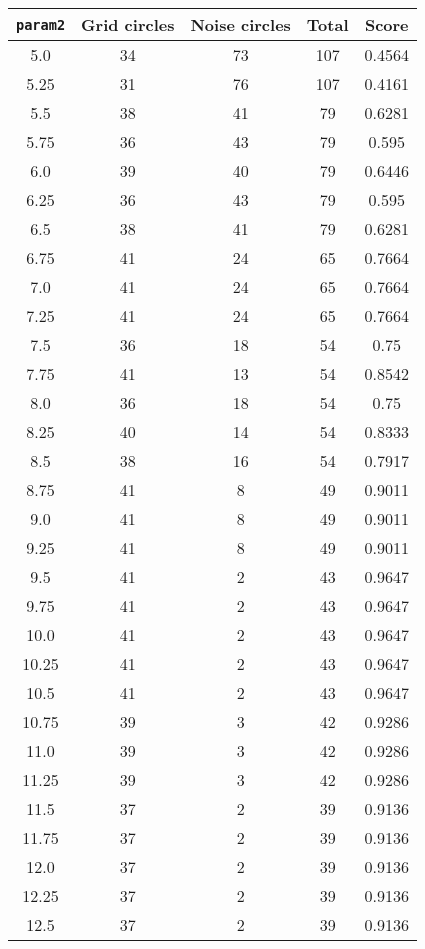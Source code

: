 \documentclass[letterpaper, 12pt]{article}
\begin{document}
\begin{longtable}{|c|c|c|c|c|}
\hline
\textbf{\texttt{param2}} & \textbf{Grid circles} & \textbf{Noise circles} & \textbf{Total} & \textbf{Score} \\
\hline
5.0 & 34 & 73 & 107 & 0.4564 \\
\hline
5.25 & 31 & 76 & 107 & 0.4161 \\
\hline
5.5 & 38 & 41 & 79 & 0.6281 \\
\hline
5.75 & 36 & 43 & 79 & 0.595 \\
\hline
6.0 & 39 & 40 & 79 & 0.6446 \\
\hline
6.25 & 36 & 43 & 79 & 0.595 \\
\hline
6.5 & 38 & 41 & 79 & 0.6281 \\
\hline
6.75 & 41 & 24 & 65 & 0.7664 \\
\hline
7.0 & 41 & 24 & 65 & 0.7664 \\
\hline
7.25 & 41 & 24 & 65 & 0.7664 \\
\hline
7.5 & 36 & 18 & 54 & 0.75 \\
\hline
7.75 & 41 & 13 & 54 & 0.8542 \\
\hline
8.0 & 36 & 18 & 54 & 0.75 \\
\hline
8.25 & 40 & 14 & 54 & 0.8333 \\
\hline
8.5 & 38 & 16 & 54 & 0.7917 \\
\hline
8.75 & 41 & 8 & 49 & 0.9011 \\
\hline
9.0 & 41 & 8 & 49 & 0.9011 \\
\hline
9.25 & 41 & 8 & 49 & 0.9011 \\
\hline
9.5 & 41 & 2 & 43 & 0.9647 \\
\hline
9.75 & 41 & 2 & 43 & 0.9647 \\
\hline
10.0 & 41 & 2 & 43 & 0.9647 \\
\hline
10.25 & 41 & 2 & 43 & 0.9647 \\
\hline
10.5 & 41 & 2 & 43 & 0.9647 \\
\hline
10.75 & 39 & 3 & 42 & 0.9286 \\
\hline
11.0 & 39 & 3 & 42 & 0.9286 \\
\hline
11.25 & 39 & 3 & 42 & 0.9286 \\
\hline
11.5 & 37 & 2 & 39 & 0.9136 \\
\hline
11.75 & 37 & 2 & 39 & 0.9136 \\
\hline
12.0 & 37 & 2 & 39 & 0.9136 \\
\hline
12.25 & 37 & 2 & 39 & 0.9136 \\
\hline
12.5 & 37 & 2 & 39 & 0.9136 \\

\end{longtable}
\end{document}
